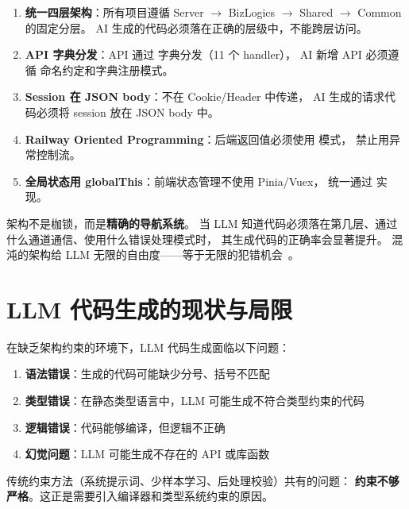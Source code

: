 \documentclass[10pt, openany]{book}
\begin{document}
\begin{enumerate}
    \item \textbf{统一四层架构}：所有项目遵循 Server \(\to\) BizLogics \(\to\) Shared \(\to\) Common 的固定分层。
        AI 生成的代码必须落在正确的层级中，不能跨层访问。
    \item \textbf{API 字典分发}：API 通过  字典分发（11 个 handler），
        AI 新增 API 必须遵循  命名约定和字典注册模式。
    \item \textbf{Session 在 JSON body}：不在 Cookie/Header 中传递，
        AI 生成的请求代码必须将 session 放在 JSON body 中。
    \item \textbf{Railway Oriented Programming}：后端返回值必须使用
         模式，
        禁止用异常控制流。
    \item \textbf{全局状态用 globalThis}：前端状态管理不使用 Pinia/Vuex，
        统一通过  实现。
\end{enumerate}

\begin{principle}[架构约束原则]
架构不是枷锁，而是\textbf{精确的导航系统}。
当 LLM 知道代码必须落在第几层、通过什么通道通信、使用什么错误处理模式时，
其生成代码的正确率会显著提升。
混沌的架构给 LLM 无限的自由度——等于无限的犯错机会~\cite{Pierce2002TAPL}。
\end{principle}

\section{LLM 代码生成的现状与局限}

在缺乏架构约束的环境下，LLM 代码生成面临以下问题：

\begin{enumerate}
    \item \textbf{语法错误}：生成的代码可能缺少分号、括号不匹配
    \item \textbf{类型错误}：在静态类型语言中，LLM 可能生成不符合类型约束的代码
    \item \textbf{逻辑错误}：代码能够编译，但逻辑不正确
    \item \textbf{幻觉问题}：LLM 可能生成不存在的 API 或库函数~\cite{Chen2021Codex,Brown2020LanguageModels}
\end{enumerate}

传统约束方法（系统提示词、少样本学习、后处理校验）共有的问题：
\textbf{约束不够严格}。这正是需要引入编译器和类型系统约束的原因。
\end{document}
